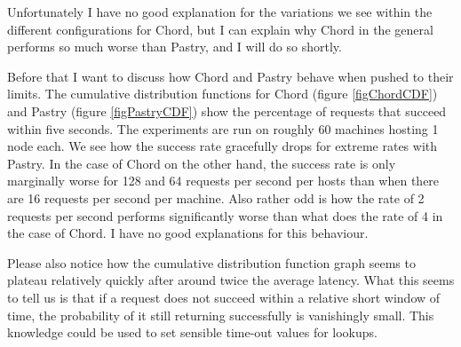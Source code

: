 Unfortunately I have no good explanation for the variations we see within the different configurations for Chord, but I can explain why Chord in the general performs so much worse than Pastry, and I will do so shortly.

Before that I want to discuss how Chord and Pastry behave when pushed to their limits. The cumulative distribution functions for Chord (figure \ref{figChordCDF}) and Pastry (figure \ref{figPastryCDF}) show the percentage of requests that succeed within five seconds. The experiments are run on roughly 60 machines hosting 1 node each. We see how the success rate gracefully drops for extreme rates with Pastry.
In the case of Chord on the other hand, the success rate is only marginally worse for 128 and 64 requests per second per hosts than when there are 16 requests per second per machine. Also rather odd is how the rate of 2 requests per second performs significantly worse than what does the rate of 4 in the case of Chord. I have no good explanations for this behaviour.

Please also notice how the cumulative distribution function graph seems to plateau relatively quickly after around twice the average latency. What this seems to tell us is that if a request does not succeed within a relative short window of time, the probability of it still returning successfully is vanishingly small. This knowledge could be used to set sensible time-out values for lookups.

